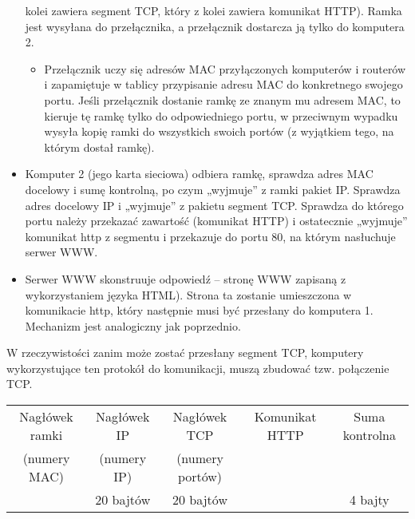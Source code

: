 \documentclass[a4paper]{article}
\begin{document}
\begin{itemize}
    kolei zawiera segment TCP, który z kolei zawiera komunikat HTTP). Ramka	jest wysyłana do przełącznika, a przełącznik dostarcza ją tylko	do komputera 2.
    \begin{itemize}
        \item Przełącznik uczy się adresów MAC przyłączonych komputerów i routerów i zapamiętuje w tablicy przypisanie adresu MAC do konkretnego swojego portu. Jeśli przełącznik dostanie ramkę ze znanym mu	 adresem MAC, to kieruje tę ramkę tylko do odpowiedniego portu, w przeciwnym wypadku wysyła kopię ramki do wszystkich swoich portów (z	wyjątkiem tego, na którym	dostał ramkę).
    \end{itemize}
    \item Komputer 2 (jego karta sieciowa) odbiera ramkę, sprawdza adres MAC docelowy i sumę kontrolną, po czym „wyjmuje” z ramki pakiet IP. Sprawdza adres docelowy IP i „wyjmuje”	z pakietu segment TCP. Sprawdza do którego portu należy przekazać zawartość (komunikat HTTP) i ostatecznie „wyjmuje” komunikat http z segmentu i przekazuje do portu 80, na którym nasłuchuje serwer WWW.
    \item Serwer WWW skonstruuje odpowiedź – stronę WWW zapisaną z wykorzystaniem języka HTML). Strona ta zostanie umieszczona w komunikacie http, który następnie musi być przesłany do komputera 1. Mechanizm jest analogiczny jak poprzednio.
\end{itemize}
W rzeczywistości zanim może zostać przesłany segment TCP, komputery wykorzystujące ten protokół do komunikacji, muszą zbudować tzw. połączenie TCP.


\begin{tabular}{|c|c|c|c|c|}
\hline
Nagłówek ramki & Nagłówek IP & Nagłówek TCP & Komunikat HTTP & Suma kontrolna\\
(numery MAC) & (numery IP) & (numery portów) & & \\
& 20 bajtów & 20 bajtów & & 4 bajty\\
\hline
\end{tabular}
\end{document}
